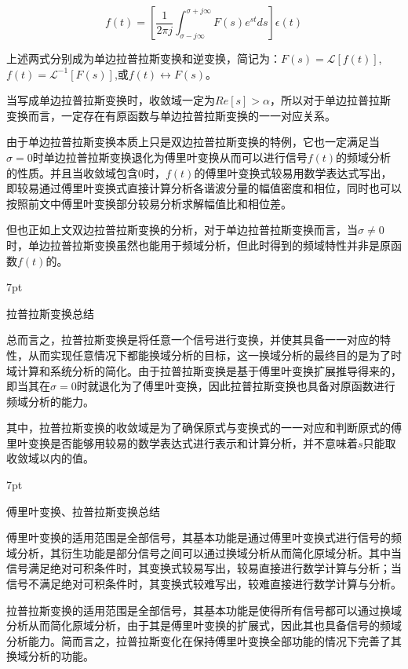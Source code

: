 \documentclass{article}
\numberwithin{equation}{section}
\numberwithin{figure}{section}
\newenvironment{formal}{%
\def\FrameCommand{%
\hspace{1pt}%
{\color{DarkBlue}\vrule width 2pt}%
{\color{formalshade}\vrule width 4pt}%
\colorbox{formalshade}%
}%
\MakeFramed{\advance\hsize-\width\FrameRestore}%
\noindent\hspace{-4.55pt}%
\begin{adjustwidth}{}{7pt}%
\vspace{2pt}\vspace{2pt}%
}
{%
\vspace{2pt}\end{adjustwidth}\endMakeFramed%
}
\begin{document}
\begin{equation}
    f(t)=[\frac{1}{2\pi j}\int_{\sigma-j\infty}^{\sigma+j\infty}F(s)e^{st}ds]\epsilon(t)
\end{equation}

上述两式分别成为单边拉普拉斯变换和逆变换，简记为：$F(s)=\mathscr{L}[f(t)]$,$f(t)=\mathscr{L}^{-1}[F(s)]$,或$f(t)\leftrightarrow F(s)$。

当写成单边拉普拉斯变换时，收敛域一定为$Re[s]>\alpha$，所以对于单边拉普拉斯变换而言，一定存在有原函数与单边拉普拉斯变换的一一对应关系。

由于单边拉普拉斯变换本质上只是双边拉普拉斯变换的特例，它也一定满足当$\sigma=0$时单边拉普拉斯变换退化为傅里叶变换从而可以进行信号$f(t)$的频域分析的性质。并且当收敛域包含0时，$f(t)$的傅里叶变换式较易用数学表达式写出，即较易通过傅里叶变换式直接计算分析各谐波分量的幅值密度和相位，同时也可以按照前文中傅里叶变换部分较易分析求解幅值比和相位差。

但也正如上文双边拉普拉斯变换的分析，对于单边拉普拉斯变换而言，当$\sigma \neq 0$时，单边拉普拉斯变换虽然也能用于频域分析，但此时得到的频域特性并非是原函数$f(t)$的。

\begin{formal}
    拉普拉斯变换总结
\end{formal}
    总而言之，拉普拉斯变换是将任意一个信号进行变换，并使其具备一一对应的特性，从而实现任意情况下都能换域分析的目标，这一换域分析的最终目的是为了时域计算和系统分析的简化。由于拉普拉斯变换是基于傅里叶变换扩展推导得来的，即当其在$\sigma = 0$时就退化为了傅里叶变换，因此拉普拉斯变换也具备对原函数进行频域分析的能力。

    其中，拉普拉斯变换的收敛域是为了确保原式与变换式的一一对应和判断原式的傅里叶变换是否能够用较易的数学表达式进行表示和计算分析，并不意味着$s$只能取收敛域以内的值。

\begin{formal}
    傅里叶变换、拉普拉斯变换总结
\end{formal}

    傅里叶变换的适用范围是全部信号，其基本功能是通过傅里叶变换式进行信号的频域分析，其衍生功能是部分信号之间可以通过换域分析从而简化原域分析。其中当信号满足绝对可积条件时，其变换式较易写出，较易直接进行数学计算与分析；当信号不满足绝对可积条件时，其变换式较难写出，较难直接进行数学计算与分析。

    拉普拉斯变换的适用范围是全部信号，其基本功能是使得所有信号都可以通过换域分析从而简化原域分析，由于其是傅里叶变换的扩展式，因此其也具备信号的频域分析能力。简而言之，拉普拉斯变化在保持傅里叶变换全部功能的情况下完善了其换域分析的功能。
\end{document}
